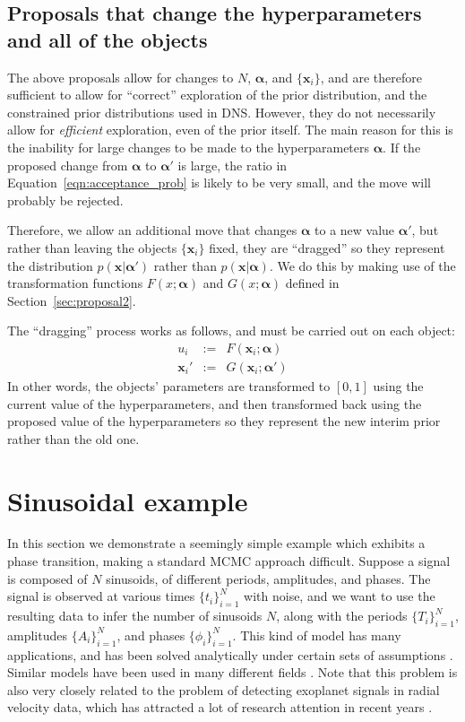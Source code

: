 \documentclass[letterpaper, 11pt]{article}
\newcommand{\hyperparams}{\boldsymbol{\alpha}}
\newcommand{\xx}{\mathbf{x}}
\begin{document}
\subsection{Proposals that change the hyperparameters
and all of the objects}\label{sec:proposal4}
The above proposals allow for changes to $N$, $\hyperparams$, and $\{\xx_i\}$,
and are therefore sufficient to allow for ``correct'' exploration of the
prior distribution, and the constrained prior distributions used in DNS.
However, they do not necessarily allow for {\it efficient} exploration, even
of the prior itself. The main reason for this is the inability for large
changes to be made to the hyperparameters $\hyperparams$. If the proposed change
from $\hyperparams$ to $\hyperparams'$ is large, the ratio in
Equation~\ref{eqn:acceptance_prob} is likely to be very small, and the move
will probably be rejected.

Therefore, we allow an additional move that changes $\hyperparams$ to a new
value $\hyperparams'$, but rather than leaving the objects $\{\xx_i\}$ fixed,
they are ``dragged''
so they represent the distribution $p(\xx | \hyperparams')$ rather than
$p(\xx|\hyperparams)$. We do this by making use of the transformation functions
$F(x; \hyperparams)$ and $G(x; \hyperparams)$ defined in
Section~\ref{sec:proposal2}.

The ``dragging'' process works as follows, and must be carried out on
each object:
\begin{eqnarray}
u_i &:=& F(\xx_i; \hyperparams)\\
\xx_i' &:=& G(\xx_i; \hyperparams')
\end{eqnarray}
In other words, the objects' parameters are transformed to $[0,1]$ using the
current value of the hyperparameters, and then transformed back using the
proposed value of the hyperparameters so they represent the new interim prior
rather than the old one.

\section{Sinusoidal example}
In this section we demonstrate a seemingly simple example which exhibits
a phase transition, making a standard MCMC approach difficult. Suppose
a signal is composed of $N$ sinusoids, of different periods, amplitudes,
and phases. The signal is observed at various times $\{t_i\}_{i=1}^N$ with
noise, and we want to use the resulting data to infer the number of sinusoids
$N$, along with the periods $\{T_i\}_{i=1}^N$, amplitudes $\{A_i\}_{i=1}^N$,
and phases $\{\phi_i\}_{i=1}^N$.
This kind of model has many applications, and has been solved analytically
under certain sets of assumptions \citep[see e.g.][]{bretthorst}. Similar
models have been used in many different fields
\citep[e.g.][]{2005PhRvD..72b2001U, 2007ApJ...654..551B, 2003AIPC..659....3B}.
Note that this problem is also very closely related to the
problem of detecting exoplanet signals in radial velocity data, which has
attracted a lot of research attention in recent years
\citep[e.g.][]{2007ApJ...654..551B, gregory, fengji, 2011MNRAS.415.3462F}.
\end{document}
